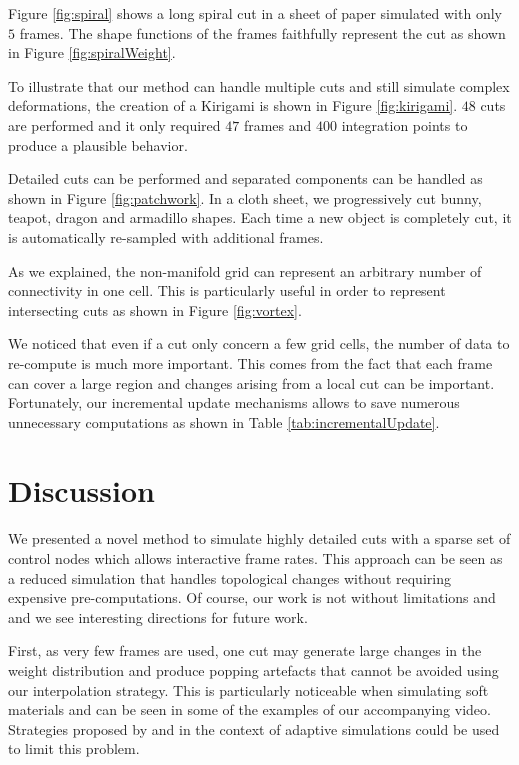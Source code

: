 \documentclass[11pt, oneside, a4paper]{memoir}
\begin{document}
Figure \ref{fig:spiral} shows a long spiral cut in a sheet of paper simulated with only $5$ frames. The shape functions of the frames faithfully represent the cut as shown in Figure \ref{fig:spiralWeight}. 

To illustrate that our method can handle multiple cuts and still simulate complex deformations, the creation of a Kirigami is shown in Figure \ref{fig:kirigami}. $48$ cuts are performed and it only required $47$ frames and $400$ integration points to produce a plausible behavior.

Detailed cuts can be performed and separated components can be handled as shown in Figure \ref{fig:patchwork}. In a cloth sheet, we progressively cut bunny, teapot, dragon and armadillo shapes. Each time a new object is completely cut, it is automatically re-sampled with additional frames.

As we explained, the non-manifold grid can represent an arbitrary number of connectivity in one cell. This is particularly useful in order to represent intersecting cuts as shown in Figure \ref{fig:vortex}.

We noticed that even if a cut only concern a few grid cells, the number of data to re-compute is much more important. This comes from the fact that each frame can cover a large region and changes arising from a local cut can be important. Fortunately, our incremental update mechanisms allows to save numerous unnecessary computations as shown in Table \ref{tab:incrementalUpdate}. 

\section{Discussion} \label{sec:discussion}

We presented a novel method to simulate highly detailed cuts with a sparse set of control nodes which allows interactive frame rates. This approach can be seen as a reduced simulation that handles topological changes without requiring expensive pre-computations. Of course, our work is not without limitations and and we see interesting directions for future work.

First, as very few frames are used, one cut may generate large changes in the weight distribution and produce popping artefacts that cannot be avoided using our interpolation strategy. This is particularly noticeable when simulating soft materials and can be seen in some of the examples of our accompanying video. Strategies proposed by \cite{Narain2013} and \cite{Tournier2014} in the context of adaptive simulations could be used to limit this problem. 
\end{document}
